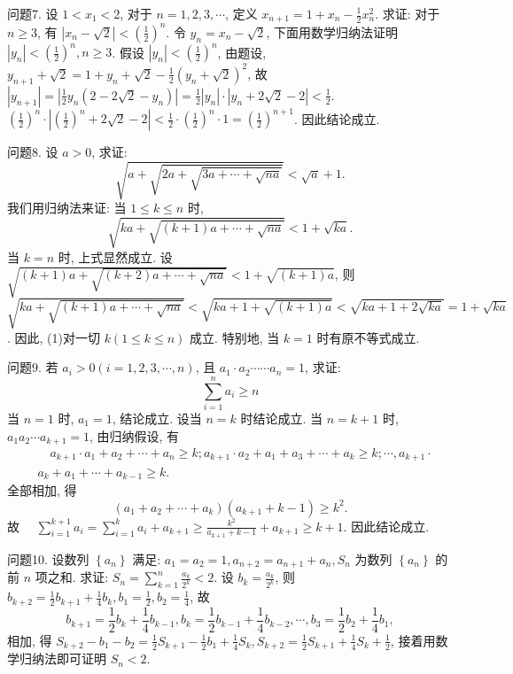 问题7. 设 $1<x_1<2$, 对于 $n=1,2,3, \cdots$, 定义 $x_{n+1}=1+x_n-\frac{1}{2} x_n^2$. 求证: 对于 $n \geqslant 3$, 有 $\left|x_n-\sqrt{2}\right|<\left(\frac{1}{2}\right)^n$.
令 $y_n=x_n-\sqrt{2}$, 下面用数学归纳法证明 $\left|y_n\right|<\left(\frac{1}{2}\right)^n, n \geqslant 3$.
假设 $\left|y_n\right|<\left(\frac{1}{2}\right)^n$, 由题设, $y_{n+1}+\sqrt{2}=1+y_n+\sqrt{2}-\frac{1}{2}\left(y_n+\sqrt{2}\right)^2$, 故 $\left|y_{n+1}\right|=\left|\frac{1}{2} y_n\left(2-2 \sqrt{2}-y_n\right)\right|=\frac{1}{2}\left|y_n\right| \cdot\left|y_n+2 \sqrt{2}-2\right|<\frac{1}{2}$. $\left(\frac{1}{2}\right)^n \cdot\left|\left(\frac{1}{2}\right)^n+2 \sqrt{2}-2\right|<\frac{1}{2} \cdot\left(\frac{1}{2}\right)^n \cdot 1=\left(\frac{1}{2}\right)^{n+1}$. 因此结论成立.



问题8. 设 $a>0$, 求证:
$$
\sqrt{a+\sqrt{2 a+\sqrt{3 a+\cdots+\sqrt{n a}}}}<\sqrt{a}+1 .
$$
我们用归纳法来证: 当 $1 \leqslant k \leqslant n$ 时,
$$
\sqrt{k a+\sqrt{(k+1) a+\cdots+\sqrt{n a}}}<1+\sqrt{k a} . \label{(1)}
$$
当 $k=n$ 时, 上式显然成立.
设 $\sqrt{(k+1) a+\sqrt{(k+2) a+\cdots+\sqrt{n a}}}<1+ \sqrt{(k+1) a}$, 则 $\sqrt{k a+\sqrt{(k+1) a+\cdots+\sqrt{n a}}}<\sqrt{k a+1+\sqrt{(k+1) a}}<\sqrt{k a+1+2 \sqrt{k a}}=1+\sqrt{k a}$.
因此, (1)对一切 $k(1 \leqslant k \leqslant n)$ 成立.
特别地, 当 $k=1$ 时有原不等式成立.



问题9. 若 $a_i>0(i=1,2,3, \cdots, n)$, 且 $a_1 \cdot a_2 \cdots \cdots a_n=1$, 求证:
$$
\sum_{i=1}^n a_i \geqslant n
$$
当 $n=1$ 时, $a_1=1$, 结论成立.
设当 $n=k$ 时结论成立.
当 $n=k+1$ 时, $a_1 a_2 \cdots a_{k+1}=1$, 由归纳假设, 有
$$
\begin{aligned}
& \quad a_{k+1} \cdot a_1+a_2+\cdots+a_n \geqslant k ; a_{k+1} \cdot a_2+a_1+a_3+\cdots+a_k \geqslant k ; \cdots, a_{k+1} \cdot \\
& a_k+a_1+\cdots+a_{k-1} \geqslant k .
\end{aligned}
$$
全部相加, 得
$$
\left(a_1+a_2+\cdots+a_k\right)\left(a_{k+1}+k-1\right) \geqslant k^2 .
$$
故 $\quad \sum_{i=1}^{k+1} a_i=\sum_{i=1}^k a_i+a_{k+1} \geqslant \frac{k^2}{a_{k+1}+k-1}+a_{k+1} \geqslant k+1$.
因此结论成立.



问题10. 设数列 $\left\{a_n\right\}$ 满足: $a_1=a_2=1, a_{n+2}=a_{n+1}+a_n, S_n$ 为数列 $\left\{a_n\right\}$ 的前 $n$ 项之和.
求证: $S_n=\sum_{k=1}^n \frac{a_k}{2^k}<2$.
设 $b_k=\frac{a_k}{2^k}$, 则 $b_{k+2}=\frac{1}{2} b_{k+1}+\frac{1}{4} b_k, b_1=\frac{1}{2}, b_2=\frac{1}{4}$, 故
$$
b_{k+1}=\frac{1}{2} b_k+\frac{1}{4} b_{k-1}, b_k=\frac{1}{2} b_{k-1}+\frac{1}{4} b_{k-2}, \cdots, b_3=\frac{1}{2} b_2+\frac{1}{4} b_1,
$$
相加, 得 $S_{k+2}-b_1-b_2=\frac{1}{2} S_{k+1}-\frac{1}{2} b_1+\frac{1}{4} S_k, S_{k+2}=\frac{1}{2} S_{k+1}+\frac{1}{4} S_k+\frac{1}{2}$, 接着用数学归纳法即可证明 $S_n<2$.



